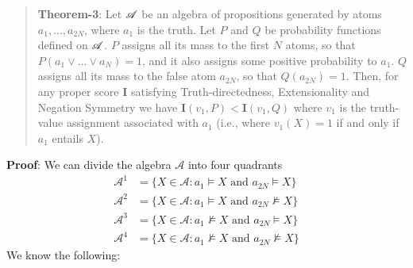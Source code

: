 \begin{quote}
\textbf{Theorem-3}: Let $\mathscr{A}$ be an algebra of propositions generated by atoms $a_1, ..., a_{2N}$, where $a_1$ is the truth.  Let $P$ and $Q$ be probability functions defined on $\mathscr{A}$.  $P$ assigns all its mass to the first $N$ atoms, so that $P(a_1 \vee \dots \vee a_N) = 1$, and it also assigns some positive probability to $a_1$.  $Q$ assigns all its mass to the false atom $a_{2N}$, so that $Q(a_{2N}) = 1$.  Then, for any proper score \textbf{I} satisfying Truth-directedness, Extensionality and Negation Symmetry we have $\mathbf{I}(v_1, P) < \mathbf{I}(v_1, Q)$ where $v_1$ is the truth-value assignment associated with $a_1$ (i.e., where $v_1(X) = 1$ if and only if $a_1$ entails $X$).
\end{quote}
\textbf{Proof}: We can divide the algebra $\mathscr{A}$ into four quadrants
\begin{align*}
\mathscr{A}^1 &= \{X \in \mathscr{A}: a_1 \vDash X \text{ and } a_{2N} \vDash X\} \\
\mathscr{A}^2 &= \{X \in \mathscr{A}: a_1 \vDash X \text{ and } a_{2N} \nvDash X\} \\
\mathscr{A}^3 &= \{X \in \mathscr{A}: a_1 \nvDash X \text{ and } a_{2N} \vDash X\} \\
\mathscr{A}^4 &= \{X \in \mathscr{A}: a_1 \nvDash X \text{ and } a_{2N} \nvDash X\}
\end{align*}
We know the following:

